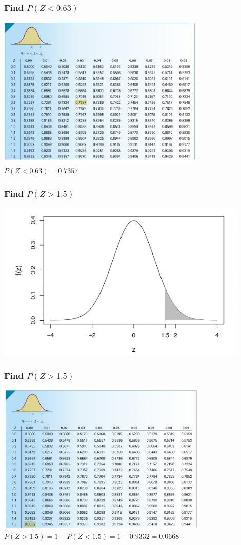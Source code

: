 \documentclass[12pt]{beamer}
\begin{document}
		\begin{frame}
		\frametitle{Find $P(Z<0.63)$}
		\centering
		\includegraphics[width=10cm]{ztable2.png}
		$P(Z<0.63)=0.7357$
	\end{frame}
	\begin{frame}
		\frametitle{Find $P(Z>1.5)$}
		\centering
		\includegraphics[width=12cm]{normal7.png}
	\end{frame}
\begin{frame}
	\frametitle{Find $P(Z>1.5)$}
	\centering
	\includegraphics[width=10cm]{ztable3.png}
	$P(Z>1.5)=1-P(Z<1.5)=1-0.9332=0.0668$
\end{frame}
\end{document}

